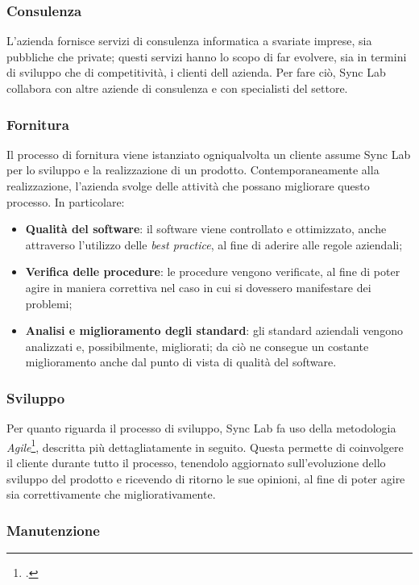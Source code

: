 \subsubsection*{Consulenza}

L'azienda fornisce servizi di consulenza informatica a svariate imprese, sia pubbliche che private; questi servizi hanno lo scopo di far evolvere, sia in termini di sviluppo che di competitività, i clienti dell azienda. Per fare ciò, Sync Lab collabora con altre aziende di consulenza e con specialisti del settore.

\subsubsection*{Fornitura}

Il processo di fornitura viene istanziato ogniqualvolta un cliente assume Sync Lab per lo sviluppo e la realizzazione di un prodotto. Contemporaneamente alla realizzazione, l'azienda svolge delle attività che possano migliorare questo processo. In particolare:
\begin{itemize}
  \item \textbf{Qualità del software}: il software viene controllato e ottimizzato, anche attraverso l'utilizzo delle \textit{best practice}, al fine di aderire alle regole aziendali;
  \item \textbf{Verifica delle procedure}: le procedure vengono verificate, al fine di poter agire in maniera correttiva nel caso in cui si dovessero manifestare dei problemi;
  \item \textbf{Analisi e miglioramento degli standard}: gli standard aziendali vengono analizzati e, possibilmente, migliorati; da ciò ne consegue un costante miglioramento anche dal punto di vista di qualità del software.
\end{itemize}

\subsubsection*{Sviluppo}

Per quanto riguarda il processo di sviluppo, Sync Lab fa uso della metodologia \textit{Agile}\footcite{tec:agile}, descritta più dettagliatamente in seguito. Questa permette di coinvolgere il cliente durante tutto il processo, tenendolo aggiornato sull'evoluzione dello sviluppo del prodotto e ricevendo di ritorno le sue opinioni, al fine di poter agire sia correttivamente che migliorativamente.

\subsubsection*{Manutenzione}

